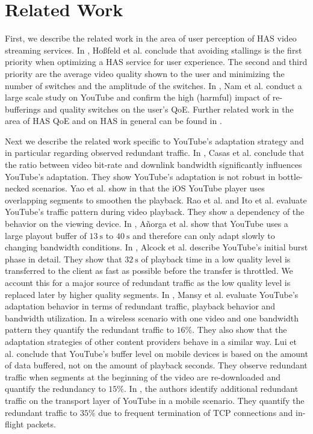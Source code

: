 
\section{Related Work}
\label{sec:relatedwork}

First, we describe the related work in the area of user perception of HAS video streaming services.
In \cite{hossfeld2015identifying, hossfeld14assessingeffect}, Hoßfeld et al. conclude that avoiding stallings is the first priority when optimizing a HAS service for user experience. 
The second and third priority are the average video quality shown to the user and minimizing the number of switches and the amplitude of the switches.
In \cite{nam16qoe}, Nam et al. conduct a large scale study on YouTube and confirm the high (harmful) impact of re-bufferings and quality switches on the user's QoE.
Further related work in the area of HAS QoE and on HAS in general can be found in \cite{seufert2015survey}.

Next we describe the related work specific to YouTube's adaptation strategy and in particular regarding observed redundant traffic.
In \cite{casas2012youtube}, Casas et al. conclude that the ratio between video bit-rate and downlink bandwidth significantly influences YouTube's adaptation.
They show YouTube's adaptation is not robust in bottle-necked scenarios.
Yao et al. show in \cite{Yao2014b} that the iOS YouTube player uses overlapping segments to smoothen the playback.
Rao et al. \cite{rao2011network} and Ito et al. \cite{ito14networklevel} evaluate YouTube's traffic pattern during video playback. They show a dependency of the behavior on the viewing device.
In \cite{Anorga2015}, A\~norga et al. show that YouTube uses a large playout buffer of $\SI{13}{\second}$ to $\SI{40}{\second}$ and therefore can only adapt slowly to changing bandwidth conditions.
In \cite{alcock11application}, Alcock et al. describe YouTube's initial burst phase in detail. They show that $\SI{32}{\second}$ of playback time in a low quality level is transferred to the client as fast as possible before the transfer is throttled. We account this for a major source of redundant traffic as the low quality level is replaced later by higher quality segments.
In \cite{Mansy2014}, Mansy et al. evaluate YouTube's adaptation behavior in terms of redundant traffic, playback behavior and bandwidth utilization. In a wireless scenario with one video and one bandwidth pattern they quantify the redundant traffic to $16\%$. They also show that the adaptation strategies of other content providers behave in a similar way.
Lui et al. \cite{liu2013comparative} conclude that YouTube's buffer level on mobile devices is based on the amount of data buffered, not on the amount of playback seconds. They observe redundant traffic when segments at the beginning of the video are re-downloaded and quantify the redundancy to $15\%$.
In \cite{nam2013mobile}, the authors identify additional redundant traffic on the transport layer of YouTube in a mobile scenario. They quantify the redundant traffic to $35\%$ due to frequent termination of TCP connections and in-flight packets.
